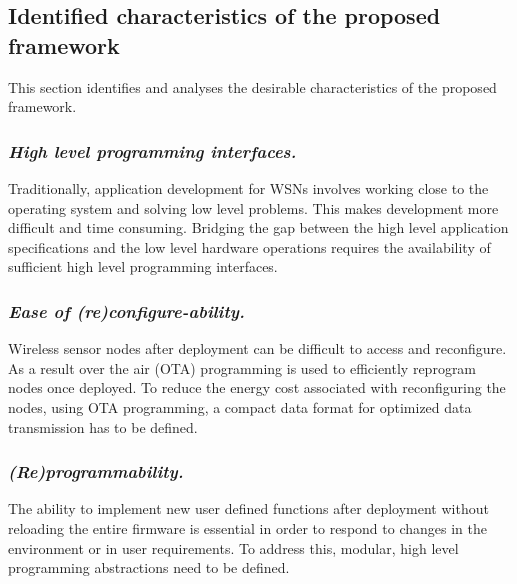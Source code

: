 \subsection{Identified characteristics of the proposed framework}
This section identifies and analyses the desirable characteristics of the proposed framework.

	\subsubsection{ \textbf{\emph{High level programming interfaces.}}} Traditionally, application development for WSNs involves working close to the operating system and solving low level problems. This makes development more difficult and time consuming. Bridging the gap between the high level application specifications and the low level hardware operations requires the availability of sufficient high level programming interfaces.
	
	\subsubsection{ \textbf{\emph{Ease of (re)configure-ability.}}} 
	
	
	Wireless sensor nodes after deployment can be difficult to access and reconfigure. As a result over the air (OTA) programming is used to efficiently reprogram nodes once deployed. To reduce the energy cost associated with reconfiguring the nodes, using OTA programming, a compact data format for optimized data transmission has to be defined. 
	
	\subsubsection{ \textbf{\emph{(Re)programmability.}}} The ability to implement new user defined functions after deployment without reloading the entire firmware is essential in order to respond to changes in the environment or in user requirements. To address this, modular, high level programming abstractions need to be defined.   
	
